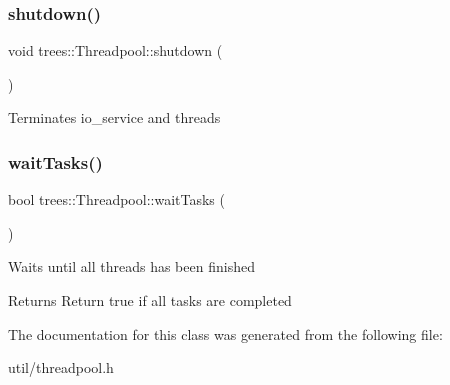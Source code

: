 \subsubsection{\texorpdfstring{shutdown()}{shutdown()}}
{\footnotesize\ttfamily void trees\+::\+Threadpool\+::shutdown (\begin{DoxyParamCaption}{ }\end{DoxyParamCaption})\hspace{0.3cm}{\ttfamily [inline]}}

Terminates io\+\_\+service and threads \mbox{\label{classtrees_1_1_threadpool_a5675fede770bf61c78cdd2d0250acc93}} 
\subsubsection{\texorpdfstring{wait\+Tasks()}{waitTasks()}}
{\footnotesize\ttfamily bool trees\+::\+Threadpool\+::wait\+Tasks (\begin{DoxyParamCaption}{ }\end{DoxyParamCaption})\hspace{0.3cm}{\ttfamily [inline]}}

Waits until all threads has been finished

\begin{DoxyReturn}{Returns}
Return true if all tasks are completed 
\end{DoxyReturn}


The documentation for this class was generated from the following file\+:\begin{DoxyCompactItemize}
\item 
util/threadpool.\+h\end{DoxyCompactItemize}
